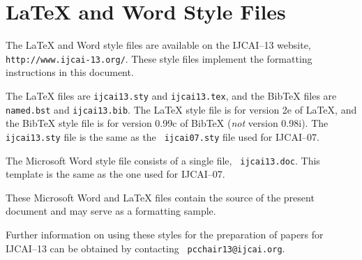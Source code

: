 \documentclass{article}
\begin{document}
\appendix

\section{\LaTeX{} and Word Style Files}\label{stylefiles}

The \LaTeX{} and Word style files are available on the IJCAI--13
website, {\tt http://www.ijcai-13.org/}.
These style files implement the formatting instructions in this
document.

The \LaTeX{} files are {\tt ijcai13.sty} and {\tt ijcai13.tex}, and
the Bib\TeX{} files are {\tt named.bst} and {\tt ijcai13.bib}. The
\LaTeX{} style file is for version 2e of \LaTeX{}, and the Bib\TeX{}
style file is for version 0.99c of Bib\TeX{} ({\em not} version
0.98i). The {\tt ijcai13.sty} file is the same as the {\tt
ijcai07.sty} file used for IJCAI--07.

The Microsoft Word style file consists of a single file, {\tt
ijcai13.doc}. This template is the same as the one used for
IJCAI--07.

These Microsoft Word and \LaTeX{} files contain the source of the
present document and may serve as a formatting sample.  

Further information on using these styles for the preparation of
papers for IJCAI--13 can be obtained by contacting {\tt
pcchair13@ijcai.org}.



\end{document}
